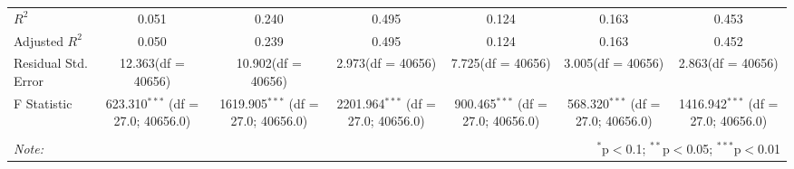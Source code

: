 \begin{table}[!htbp]
\begin{tabular}{@{\extracolsep{5pt}}lcccccc}
 $R^2$ & 0.051 & 0.240 & 0.495 & 0.124 & 0.163 & 0.453 \\
 Adjusted $R^2$ & 0.050 & 0.239 & 0.495 & 0.124 & 0.163 & 0.452 \\
 Residual Std. Error & 12.363(df = 40656) & 10.902(df = 40656) & 2.973(df = 40656) & 7.725(df = 40656) & 3.005(df = 40656) & 2.863(df = 40656)  \\
 F Statistic & 623.310$^{***}$ (df = 27.0; 40656.0) & 1619.905$^{***}$ (df = 27.0; 40656.0) & 2201.964$^{***}$ (df = 27.0; 40656.0) & 900.465$^{***}$ (df = 27.0; 40656.0) & 568.320$^{***}$ (df = 27.0; 40656.0) & 1416.942$^{***}$ (df = 27.0; 40656.0) \\
\hline
\hline \\[-1.8ex]
\textit{Note:} & \multicolumn{6}{r}{$^{*}$p$<$0.1; $^{**}$p$<$0.05; $^{***}$p$<$0.01} \\
\end{tabular}
\end{table}